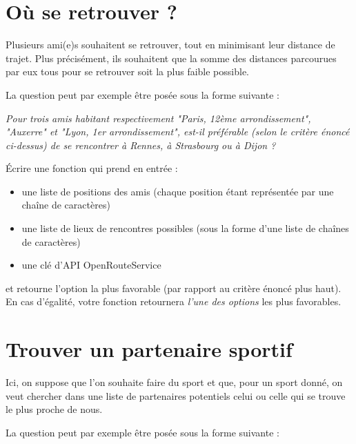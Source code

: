 \documentclass[11pt,a4paper]{article}
\begin{document}
\section{Où se retrouver ?}

Plusieurs ami(e)s souhaitent se retrouver, tout en minimisant leur distance de trajet. Plus précisément, ils souhaitent que la somme des distances parcourues par eux tous pour se retrouver soit la plus faible possible.
    
La question peut par exemple être posée sous la forme suivante :
    
\emph{Pour trois amis habitant respectivement "Paris, 12ème arrondissement", "Auxerre" et "Lyon, 1er arrondissement", est-il préférable (selon le critère énoncé ci-dessus) de se rencontrer à Rennes, à Strasbourg ou à Dijon ?}
\newpage

Écrire une fonction qui prend en entrée :
\begin{itemize}

         \item une liste de positions des amis (chaque position étant représentée par une chaîne de caractères)
           \item une liste de lieux de rencontres possibles (sous la forme d'une liste de chaînes de caractères)
        \item une clé d'API OpenRouteService
\end{itemize}
        et retourne l'option la plus favorable (par rapport au critère énoncé plus haut). En cas d'égalité, votre fonction retournera \emph{l'une des options} les plus favorables.

\section{Trouver un partenaire sportif}
Ici, on suppose que l'on souhaite faire du sport et que, pour un sport donné, on veut chercher dans une liste de partenaires potentiels celui ou celle qui se trouve le plus proche de nous.

La question peut par exemple être posée sous la forme suivante :
\end{document}

